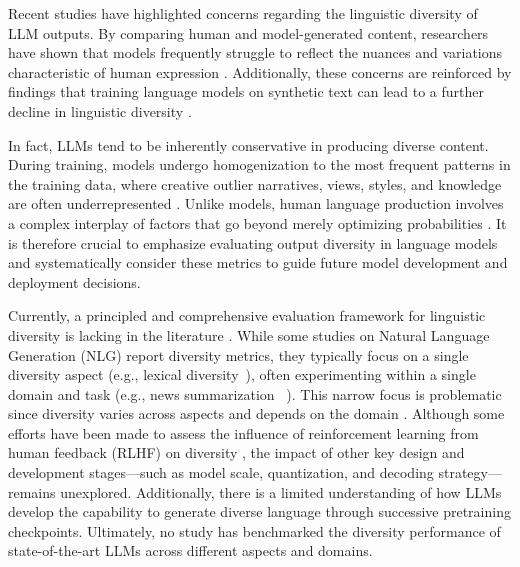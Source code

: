 \documentclass[11pt,a4paper]{article}
\begin{document}

Recent studies have highlighted concerns regarding the linguistic diversity of LLM outputs. By comparing human and model-generated content, researchers have shown that models frequently struggle to reflect the nuances and variations characteristic of human expression \citep{shaib2024standardizing,giulianelli-etal-2023-comes}. Additionally, these concerns are reinforced by findings that training language models on synthetic text can lead to a further decline in linguistic diversity \citep{guo-etal-2024-curious}.

In fact, LLMs tend to be inherently conservative in producing diverse content. During training, models undergo homogenization to the most frequent patterns in the training data, where creative outlier narratives, views, styles, and knowledge are often underrepresented \citep{kandpal2023large}. Unlike models, human language production involves a complex interplay of factors that go beyond merely optimizing probabilities \citep{Holtzman2020The}. It is therefore crucial to emphasize evaluating output diversity in language models and systematically consider these metrics to guide future model development and deployment decisions.

Currently, a principled and comprehensive evaluation framework for linguistic diversity is lacking in the literature \citep{shaib2024standardizing}.	
While some studies on Natural Language Generation (NLG) report diversity metrics, they typically focus on a single diversity aspect (e.g., lexical diversity~\citep{chakrabarty-etal-2022-help}), often experimenting within a single domain and task (e.g., news summarization ~\citep{shaib2024standardizing}). This narrow focus is problematic since diversity varies across aspects and depends on the domain \citep{guo-etal-2024-curious}.	
Although some efforts have been made to assess the influence of reinforcement learning from human feedback (RLHF) on diversity \citep{kirk2024understanding}, the impact of other key design and development stages—such as model scale, quantization, and decoding strategy—remains unexplored. 
Additionally, there is a limited understanding of how LLMs develop the capability to generate diverse language through successive pretraining checkpoints.
Ultimately, no study has benchmarked the diversity performance of state-of-the-art LLMs across different aspects and domains.
\end{document}
